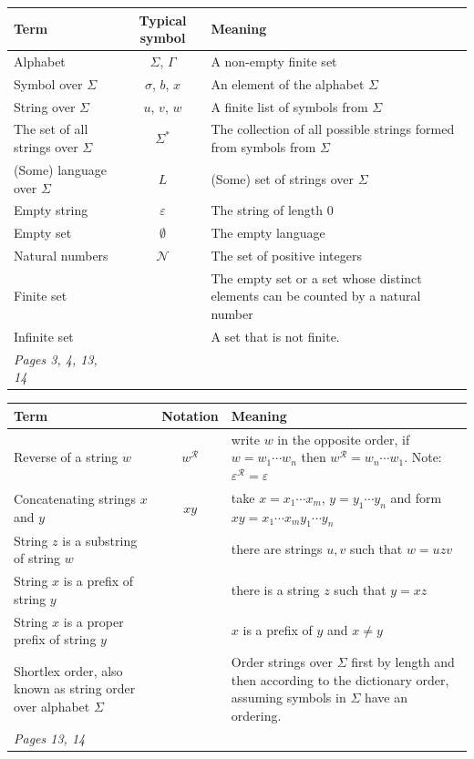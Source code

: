 \documentclass[12pt, oneside]{article}
\begin{document}
\begin{center}
    \begin{tabular}{|p{2in}cp{4in}|}
    \hline 
    Term & Typical symbol & Meaning \\
    \hline\hline
    Alphabet & $\Sigma$, $\Gamma$ & A non-empty finite set	 \\ \hline
    Symbol over $\Sigma$  & $\sigma$, $b$, $x$ & An element of the alphabet $\Sigma$\\ \hline
    String over $\Sigma$  &	$u$, $v$, $w$ & A finite list of symbols from $\Sigma$\\ \hline
    The set of all strings over $\Sigma$ & $\Sigma^*$ & The collection of all possible strings formed from symbols from $\Sigma$ \\ \hline
    (Some) language over $\Sigma$& $L$ & (Some) set of strings over $\Sigma$ \\ \hline
    Empty string &$\varepsilon$ & The string of length $0$\\ \hline
    Empty set &$\emptyset$ & The empty language\\ \hline
    Natural numbers &$\mathcal{N}$ & The set of positive integers \\ \hline
    Finite set & & The empty set or a set whose distinct elements can be counted by a natural number\\ \hline
    Infinite set & & A set that is not finite.\\ 
    \hline\hline
    {\it Pages 3, 4, 13, 14 }& & \\
    \hline
    \end{tabular}
\end{center}

\newpage

\begin{center}
    \begin{tabular}{|p{2.7in}cp{3.8in}|}
    \hline
    Term & Notation & Meaning \\
    \hline \hline
    Reverse of a string $w$ & $w^\mathcal{R}$  & write $w$  in  the opposite order, if $w = w_1 \cdots  w_n$ then $w^\mathcal{R} = w_n \cdots  w_1$. Note: $\varepsilon^\mathcal{R} = \varepsilon$\\ \hline
    Concatenating strings $x$ and $y$ & $xy$ &  take $x = x_1 \cdots x_m$, $y=y_1 \cdots y_n$ and form $xy = x_1 \cdots x_m y_1 \cdots y_n$\\ \hline
    String $z$ is a substring of string $w$ & & there are strings $u,v$ such that $w = uzv$\\ \hline
    String $x$ is a prefix of string $y$ & & there is a string $z$ such that $y = xz$ \\ \hline
    String $x$ is a proper prefix of string $y$ & & $x$ is a prefix of $y$ and $x \neq y$\\ \hline
    Shortlex order, also known as string order over alphabet $\Sigma$ & & Order strings over  $\Sigma$ first by length and then according to the dictionary order, assuming symbols in $\Sigma$  have an ordering.\\ \hline
    \hline \hline
    {\it Pages 13, 14} & & \\
    \hline
    \end{tabular}
\end{center}
\end{document}
